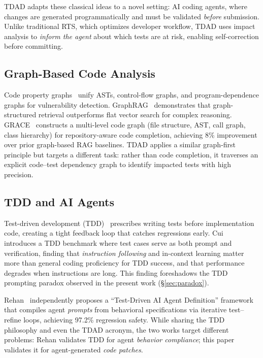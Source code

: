 \documentclass[sigconf,nonacm]{acmart}
\begin{document}
\textsc{TDAD} adapts these classical ideas to a novel setting: AI coding
agents, where changes are generated programmatically and must be validated
\emph{before} submission.  Unlike traditional RTS, which optimizes developer
workflow, \textsc{TDAD} uses impact analysis to \emph{inform the agent} about
which tests are at risk, enabling self-correction before committing.

\subsection{Graph-Based Code Analysis}

Code property graphs~\cite{yamaguchi2014modeling} unify ASTs,
control-flow graphs, and program-dependence graphs for vulnerability
detection.  GraphRAG~\cite{edge2024graphrag} demonstrates that
graph-structured retrieval outperforms flat vector search for complex
reasoning.  GRACE~\cite{wang2025grace} constructs a multi-level code
graph (file structure, AST, call graph, class hierarchy) for
repository-aware code completion, achieving 8\% improvement over
prior graph-based RAG baselines.  \textsc{TDAD} applies a similar
graph-first principle but targets a different task: rather than
code completion, it traverses an explicit code--test dependency graph
to identify impacted tests with high precision.

\subsection{TDD and AI Agents}

Test-driven development (TDD)~\cite{beck2003tdd} prescribes writing tests
before implementation code, creating a tight feedback loop that catches
regressions early.  Cui~\cite{cui2025testsasprompt} introduces a TDD
benchmark where test cases serve as both prompt and verification,
finding that \emph{instruction following} and in-context learning matter
more than general coding proficiency for TDD success, and that
performance degrades when instructions are long.  This finding
foreshadows the TDD prompting paradox observed in the present work
(\S\ref{sec:paradox}).

Rehan~\cite{rehan2026tdad} independently proposes a ``Test-Driven AI Agent
Definition'' framework that compiles agent \emph{prompts} from behavioral
specifications via iterative test--refine loops, achieving 97.2\% regression
safety.  While sharing the TDD philosophy and even the TDAD acronym, the two
works target different problems: Rehan validates TDD for agent \emph{behavior
compliance}; this paper validates it for agent-generated \emph{code patches}.
\end{document}
